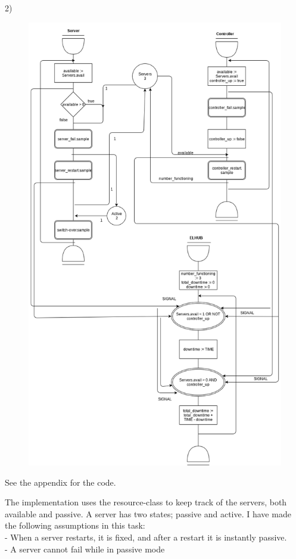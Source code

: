 \documentclass[11pt]{article}
\begin{document}
2) \\
\begin{figure}[H]
	\includegraphics[width=\textwidth]{activity_diagram2.png}
	\centering
\end{figure}

See the appendix for the code.

The implementation uses the resource-class to keep track of the servers, both available and passive. A server has two states; passive and active. I have made the following assumptions in this task:\\
- When a server restarts, it is fixed, and after a restart it is instantly passive.\\
- A server cannot fail while in passive mode\\
\end{document}
